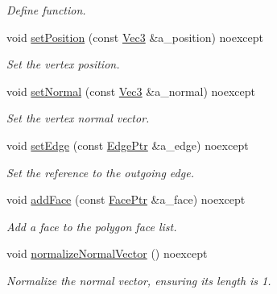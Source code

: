\begin{DoxyCompactItemize}
\begin{DoxyCompactList}\small\item\em Define function. \end{DoxyCompactList}\item 
void \hyperlink{classDcel_1_1VertexT_a9c7d9a23275e5e3165eb8c6018b55a7e}{set\+Position} (const \hyperlink{classDcel_1_1VertexT_a6e073dc7426756edef5594816be6e7c7}{Vec3} \&a\+\_\+position) noexcept
\begin{DoxyCompactList}\small\item\em Set the vertex position. \end{DoxyCompactList}\item 
void \hyperlink{classDcel_1_1VertexT_a3bffe6c4f0d0766cdd7a4bb3a6050cb4}{set\+Normal} (const \hyperlink{classDcel_1_1VertexT_a6e073dc7426756edef5594816be6e7c7}{Vec3} \&a\+\_\+normal) noexcept
\begin{DoxyCompactList}\small\item\em Set the vertex normal vector. \end{DoxyCompactList}\item 
void \hyperlink{classDcel_1_1VertexT_a4ac13c49c61857ea7d0990212b43ca41}{set\+Edge} (const \hyperlink{classDcel_1_1VertexT_a7c049a24ac43b9750578e4f4ed543831}{Edge\+Ptr} \&a\+\_\+edge) noexcept
\begin{DoxyCompactList}\small\item\em Set the reference to the outgoing edge. \end{DoxyCompactList}\item 
void \hyperlink{classDcel_1_1VertexT_a032c39370f08bbc27f3da35ee0873409}{add\+Face} (const \hyperlink{classDcel_1_1VertexT_a5acb4c66c49319683c71f52e56ad8e8a}{Face\+Ptr} \&a\+\_\+face) noexcept
\begin{DoxyCompactList}\small\item\em Add a face to the polygon face list. \end{DoxyCompactList}\item 
\mbox{\label{classDcel_1_1VertexT_a5926f14833074dfa2acf28a3e5c36f46}} 
void \hyperlink{classDcel_1_1VertexT_a5926f14833074dfa2acf28a3e5c36f46}{normalize\+Normal\+Vector} () noexcept
\begin{DoxyCompactList}\small\item\em Normalize the normal vector, ensuring its length is 1. \end{DoxyCompactList}\item 
\mbox{\label{classDcel_1_1VertexT_adb439515e1814e3fdd9d040b9c1b22df}} 

\end{DoxyCompactItemize}
